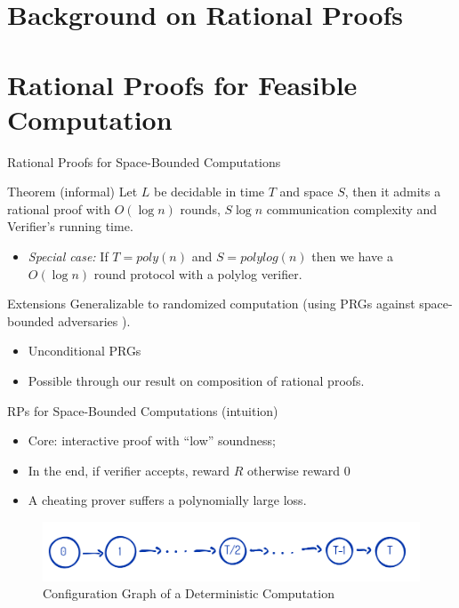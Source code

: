 \section{Background on Rational Proofs}


\section{Rational Proofs for Feasible Computation}

\begin{frame}{Rational Proofs for Space-Bounded Computations}
\begin{block}{Theorem (informal)}
	Let $L$ be decidable in time $T$ and space $S$\pause, then it admits a rational proof with $O(\log n)$ rounds, $S \log n$ communication complexity and Verifier's running time.
\end{block}
\pause
\begin{itemize}
	\item \textit{Special case:} If $T=poly(n)$ and $S=polylog(n)$ then we have a $O(\log n)$ round protocol with a polylog verifier.
\end{itemize}
\pause
\bigskip
\begin{block}{Extensions}
	 Generalizable to randomized computation (using PRGs against space-bounded adversaries \cite{nisan1992pseudorandom}).
	 \pause
\begin{itemize}[<+->]
	\item Unconditional PRGs
	\item Possible through our  result on composition of rational proofs.
\end{itemize}
\end{block}
\end{frame}

\begin{frame}{RPs for Space-Bounded Computations (intuition)}
\begin{itemize}
	\item Core: interactive proof with ``low'' soundness;\pause
	\item In the end, if verifier accepts, reward $R$ otherwise reward $0$\pause
	\item A cheating prover suffers a polynomially large loss.
\end{itemize}
\medskip
\begin{figure}
	\pause
	\includegraphics[scale=0.3]{pics/space-protocol.png}
	\caption{Configuration Graph of a Deterministic  Computation}
\end{figure}
\end{frame}

